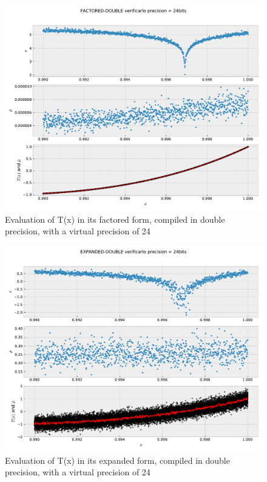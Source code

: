 \documentclass{TP}
\begin{document}
\begin{figure}[h]
  \center \includegraphics[width=.8\textwidth]{FACTORED-DOUBLE-24-zoom.pdf}
  \caption{Evaluation of T(x) in its factored form, compiled in double
    precision, with a virtual precision of 24}
  \label{fig:factored:double:24:zoom}
\end{figure}

\begin{figure}[h]
  \center \includegraphics[width=.8\textwidth]{EXPANDED-DOUBLE-24-zoom.pdf}
  \caption{Evaluation of T(x) in its expanded form, compiled in double
    precision, with a virtual precision of 24}
  \label{fig:expanded:double:24:zoom}
\end{figure}
\end{document}
